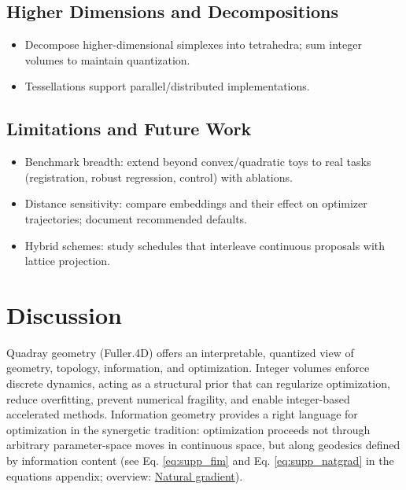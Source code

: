 \documentclass[
  10pt,
]{article}
\providecommand{\tightlist}{%
  \setlength{\itemsep}{0pt}\setlength{\parskip}{0pt}}
\begin{document}
\hypertarget{higher-dimensions-and-decompositions}{%
\subsection{Higher Dimensions and
Decompositions}\label{higher-dimensions-and-decompositions}}

\begin{itemize}
\tightlist
\item
  Decompose higher-dimensional simplexes into tetrahedra; sum integer
  volumes to maintain quantization.
\item
  Tessellations support parallel/distributed implementations.
\end{itemize}

\hypertarget{limitations-and-future-work}{%
\subsection{Limitations and Future
Work}\label{limitations-and-future-work}}

\begin{itemize}
\tightlist
\item
  Benchmark breadth: extend beyond convex/quadratic toys to real tasks
  (registration, robust regression, control) with ablations.
\item
  Distance sensitivity: compare embeddings and their effect on optimizer
  trajectories; document recommended defaults.
\item
  Hybrid schemes: study schedules that interleave continuous proposals
  with lattice projection.
\end{itemize}

\newpage

\hypertarget{discussion}{%
\section{Discussion}\label{discussion}}

Quadray geometry (Fuller.4D) offers an interpretable, quantized view of
geometry, topology, information, and optimization. Integer volumes
enforce discrete dynamics, acting as a structural prior that can
regularize optimization, reduce overfitting, prevent numerical
fragility, and enable integer-based accelerated methods. Information
geometry provides a right language for optimization in the synergetic
tradition: optimization proceeds not through arbitrary parameter-space
moves in continuous space, but along geodesics defined by information
content (see Eq. \eqref{eq:supp_fim} and Eq. \eqref{eq:supp_natgrad} in
the equations appendix; overview:
\href{https://en.wikipedia.org/wiki/Natural_gradient}{Natural
gradient}).
\end{document}
